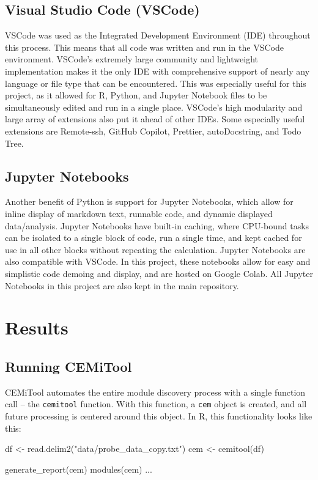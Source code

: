 \subsection{Visual Studio Code (VSCode)}
VSCode was used as the Integrated Development Environment (IDE) throughout this process. This means that all code was written and run in the VSCode environment. VSCode's extremely large community and lightweight implementation makes it the only IDE with comprehensive support of nearly any language or file type that can be encountered. This was especially useful for this project, as it allowed for R, Python, and Jupyter Notebook files to be simultaneously edited and run in a single place. VSCode's high modularity and large array of extensions also put it ahead of other IDEs. Some especially useful extensions are Remote-ssh, GitHub Copilot, Prettier, autoDocstring, and Todo Tree.

\subsection{Jupyter Notebooks}
Another benefit of Python is support for Jupyter Notebooks, which allow for inline display of markdown text, runnable code, and dynamic displayed data/analysis. Jupyter Notebooks have built-in caching, where CPU-bound tasks can be isolated to a single block of code, run a single time, and kept cached for use in all other blocks without repeating the calculation. Jupyter Notebooks are also compatible with VSCode. In this project, these notebooks allow for easy and simplistic code demoing and display, and are hosted on Google Colab. All Jupyter Notebooks in this project are also kept in the main repository.


\section{Results}

\subsection{Running CEMiTool}
CEMiTool automates the entire module discovery process with a single function call -- the \texttt{cemitool} function. With this function, a \texttt{cem} object is created, and all future processing is centered around this object. In R, this functionality looks like this:

\begin{example}
  df <- read.delim2("data/probe_data_copy.txt")
  cem <- cemitool(df)
  
  generate_report(cem)
  modules(cem)
  ...
\end{example}

